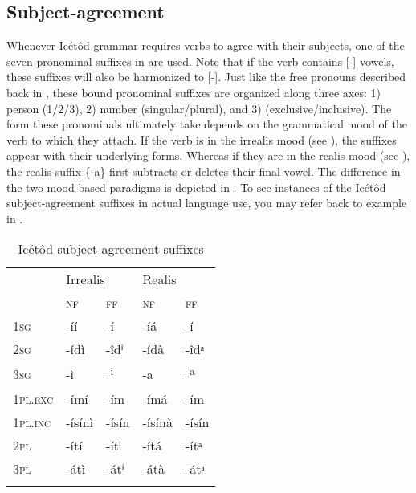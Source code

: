 \subsection{Subject-agreement}\label{sec:8.7}


Whenever Icétôd grammar requires verbs to agree with their subjects, one of the seven pronominal suffixes in  are used. Note that if the verb contains [-] vowels, these suffixes will also be harmonized to [-]. Just like the free pronouns described back in , these bound pronominal suffixes are organized along three axes: 1) person (1/2/3), 2) number (singular/plural), and 3)  (exclusive/inclusive). The form these pronominals ultimately take depends on the grammatical mood of the verb to which they attach. If the verb is in the irrealis mood (see ), the suffixes appear with their underlying forms. Whereas if they are in the realis mood (see ), the realis suffix \{-a\} first subtracts or deletes their final vowel. The difference in the two mood-based paradigms is depicted in . To see instances of the Icétôd subject-agreement suffixes in actual language use, you may refer back to example  in .


\begin{table}
\caption{Icétôd subject-agreement suffixes}
\label{tab:verbs:subj}


\begin{tabularx}{\textwidth}{XXXXX}
\lsptoprule

& \multicolumn{2}{X}{Irrealis} & \multicolumn{2}{X}{Realis}\\
& \textsc{nf} & \textsc{ff} & \textsc{nf} & \textsc{ff}\\
\midrule
\textsc{1sg} & {}-íí & {}-í & {}-íá & {}-í\\
\textsc{2sg} & {}-ídì & {}-îdⁱ & {}-ídà & {}-îdᵃ\\
\textsc{3sg} & {}-ì & {}-\textsuperscript{i} & {}-a & {}-\textsuperscript{a}\\
\textsc{1pl.exc} & {}-ímí & {}-ím & {}-ímá & {}-ím\\
\textsc{1pl.inc} & {}-ísínì & {}-ísín & {}-ísínà & {}-ísín\\
\textsc{2pl} & {}-ítí & {}-ítⁱ & {}-ítá & {}-ítᵃ\\
\textsc{3pl} & {}-átì & {}-átⁱ & {}-átà & {}-átᵃ\\
\lspbottomrule
\end{tabularx}
\end{table}






